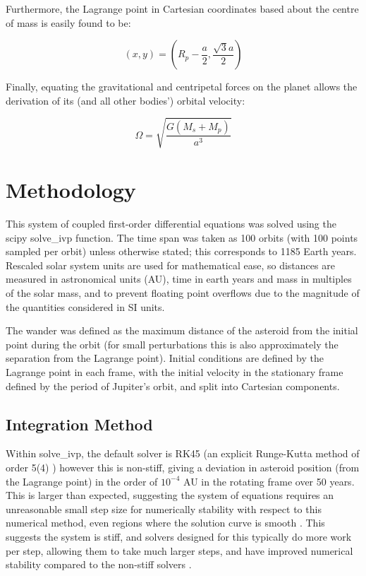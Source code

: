 \documentclass[11pt, a4paper,twocolumn]{article} %
\begin{document}
Furthermore, the Lagrange point in Cartesian coordinates based about the centre of mass is easily found to be:

\begin{equation}
(x,y) = \left( R_{p} - \frac{a}{2}, \frac{ \sqrt{3} a}{2} \right)
\end{equation}

Finally, equating the gravitational and centripetal forces on the planet allows the derivation of its (and all other bodies') orbital velocity:

\begin{equation}
\Omega = \sqrt{\frac{G (M_{s} + M_{p})}{a^{3}}}
\end{equation}

\section{Methodology}
This system of coupled first-order differential equations was solved using the scipy solve\_ivp function. The time span was taken as 100 orbits (with 100 points sampled per orbit) unless otherwise stated; this corresponds to 1185 Earth years. Rescaled solar system units are used for mathematical ease, so distances are measured in astronomical units (AU), time in earth years and mass in multiples of the solar mass, and to prevent floating point overflows due to the magnitude of the quantities considered in SI units.


The wander was defined as the maximum distance of the asteroid from the initial point during the orbit (for small perturbations this is also approximately the separation from the Lagrange point).
Initial conditions are defined by the Lagrange point in each frame, with the initial velocity in the stationary frame defined by the period of Jupiter's orbit, and split into Cartesian components.

\subsection{Integration Method}
Within solve\_ivp, the default solver is RK45 (an explicit Runge-Kutta method of order 5(4) \cite{Dormand1980}) however this is non-stiff, giving a deviation in asteroid position (from the Lagrange point) in the order of $ 10^{-4}$ AU in the rotating frame over 50 years. This is larger than expected, suggesting the system of equations requires an unreasonable small step size for  numerically stability with respect to this numerical method, even regions where the solution curve is smooth \cite{Lambert1991}. This suggests the system is stiff, and solvers designed for this typically do more work per step, allowing them to take much larger steps, and have improved numerical stability compared to the non-stiff solvers \cite{Byrne1987}. 
\end{document}
